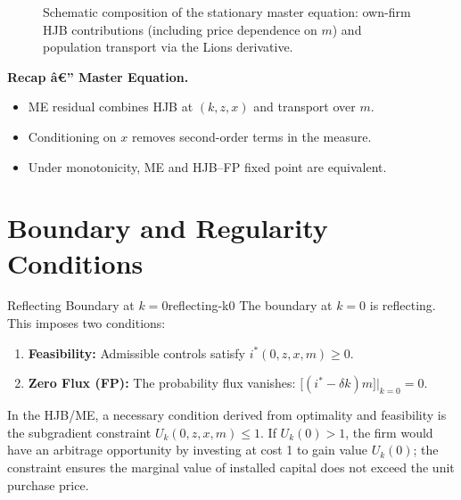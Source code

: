 ﻿\documentclass[11pt,letterpaper,oneside]{article}
\numberwithin{equation}{section}
\newcommand{\1}{\mathbf{1}}
\newcommand{\Dm}{D\_m}
\begin{document}
\begin{figure}[ht]
\centering
{}
\label{fig:me_schematic}
\caption{Schematic composition of the stationary master equation: own-firm HJB contributions (including price dependence on $m$) and population transport via the Lions derivative.}
\end{figure}

\begin{tcolorbox}[didacticstyle]
\textbf{Recap â€” Master Equation.}
\begin{itemize}[leftmargin=1.15em,itemsep=0.2em]
  \item ME residual combines HJB at $(k,z,x)$ and transport over $m$.
  \item Conditioning on $x$ removes second-order terms in the measure.
  \item Under monotonicity, ME and HJB--FP fixed point are equivalent.
\end{itemize}
\end{tcolorbox}

\section{Boundary and Regularity Conditions}
\label{sec:boundary-regularity}

\begin{definition}{Reflecting Boundary at $k=0$}{reflecting-k0}
The boundary at $k=0$ is reflecting. This imposes two conditions:
\begin{enumerate}[label=(\roman*),itemsep=0.25em]
    \item \textbf{Feasibility:} Admissible controls satisfy $i^*(0,z,x,m)\ge 0$.
    \item \textbf{Zero Flux (FP):} The probability flux vanishes: $\big[(i^*-\delta k)m\big]\big|_{k=0}=0$.
\end{enumerate}
In the HJB/ME, a necessary condition derived from optimality and feasibility is the subgradient constraint $U_k(0,z,x,m)\le 1$. If $U_k(0)>1$, the firm would have an arbitrage opportunity by investing at cost 1 to gain value $U_k(0)$; the constraint ensures the marginal value of installed capital does not exceed the unit purchase price.
\end{definition}
\end{document}
